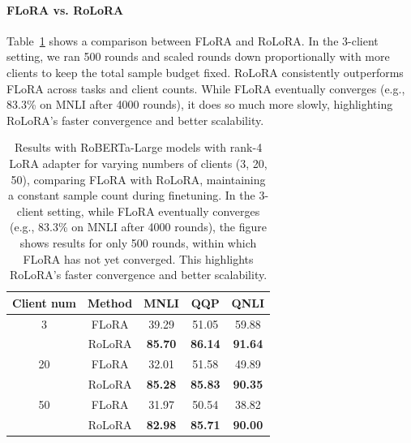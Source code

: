 \documentclass{article}
\theoremstyle{plain}
\theoremstyle{definition}
\theoremstyle{remark}
\begin{document}
\paragraph{FLoRA vs. RoLoRA} Table~\ref{tab:flora_vs_rolora} shows a comparison between FLoRA and RoLoRA. In the 3-client setting, we ran 500 rounds and scaled rounds down proportionally with more clients to keep the total sample budget fixed. RoLoRA consistently outperforms FLoRA across tasks and client counts. While FLoRA eventually converges (e.g., 83.3\% on MNLI after 4000 rounds), it does so much more slowly, highlighting RoLoRA's faster convergence and better scalability.




\begin{table}[h!]
{\footnotesize
\centering
\begin{tabular}{c c c c c}
\toprule
{Client num} & {Method} & {MNLI} & {QQP} & {QNLI} \\
\midrule
3  & FLoRA  & 39.29  & 51.05  & 59.88 \\
   & \cellcolor{ours} RoLoRA & \cellcolor{ours} \textbf{85.70} & \cellcolor{ours}  \textbf{86.14} & \cellcolor{ours} \textbf{91.64} \\
\midrule
20 & FLoRA  & 32.01  & 51.58  & 49.89 \\
   & \cellcolor{ours} RoLoRA &  \cellcolor{ours} \textbf{85.28} & \cellcolor{ours}  \textbf{85.83} & \cellcolor{ours} \textbf{90.35} \\
\midrule
50 & FLoRA  & 31.97  & 50.54  & 38.82 \\
   & \cellcolor{ours} RoLoRA &  \cellcolor{ours} \textbf{82.98} & \cellcolor{ours}  \textbf{85.71} & \cellcolor{ours} \textbf{90.00} \\
\bottomrule
\end{tabular}
\vspace{4pt}
\caption{Results with RoBERTa-Large models with rank-4 LoRA adapter for varying numbers of clients (3, 20, 50), comparing FLoRA with RoLoRA, maintaining a constant sample count during finetuning. In the 3-client setting, while FLoRA eventually converges (e.g., 83.3\% on MNLI after 4000 rounds), the figure shows results for only 500 rounds, within which FLoRA has not yet converged. This highlights RoLoRA's faster convergence and better scalability.}
\label{tab:flora_vs_rolora}}
\end{table}
\end{document}
